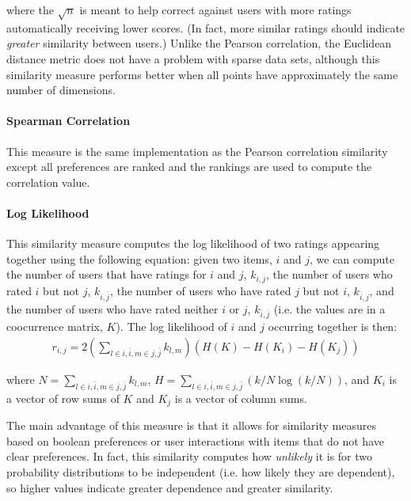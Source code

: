 \documentclass{article}
\begin{document}
where the $\sqrt{n}$ is meant to help correct against users with more ratings automatically receiving lower scores. 
(In fact, more similar ratings should indicate \emph{greater} similarity between users.) Unlike the Pearson correlation,
the Euclidean distance metric does not have a problem with sparse data sets, although this similarity measure 
performs better when all points have approximately the same number of dimensions. 

\paragraph{Spearman Correlation}

This measure is the same implementation as the Pearson correlation similarity except all preferences are ranked and the 
rankings are used to compute the correlation value.

\paragraph{Log Likelihood}

This similarity measure computes the log likelihood of two ratings appearing together using the following equation: given two items, $i$ and $j$, we can compute the number of users that have ratings for $i$ and $j$, $k_{i,j}$, the number of users
who rated $i$ but not $j$, $k_{i,\overline{j}}$, the number of users who have rated $j$ but
not $i$, $k_{\overline{i}, j}$, and the number of users who have rated neither $i$ or $j$, 
$k_{\overline{i}, \overline{j}}$ (i.e. the values are in a coocurrence matrix, $K$). 
The log likelihood of $i$ and $j$ occurring together is
then:\begin{align*}
r_{i, j} = 2 \left(\sum_{l \in {i, \overline{i}}, m \in {j, \overline{j}}} k_{l, m} \right)(H(K) - H(K_i) - H(K_j))
\end{align*}

where $N = \sum_{l \in {i, \overline{i}}, m \in {j, \overline{j}}} k_{l, m}$, $H = \sum_{l \in {i, \overline{i}}, m \in {j, \overline{j}}}\left(k/N \log(k/N)\right)$, and $K_i$ is a vector of row sums of $K$ and $K_j$ is a vector of column sums. 

The main advantage of this measure is that it allows for similarity measures based on boolean preferences or user
interactions with items that do not have clear preferences. In fact, this similarity computes how \emph{unlikely} it is
for two probability distributions to be independent (i.e. how likely they are dependent), so higher values indicate 
greater dependence and greater similarity.
\end{document}
